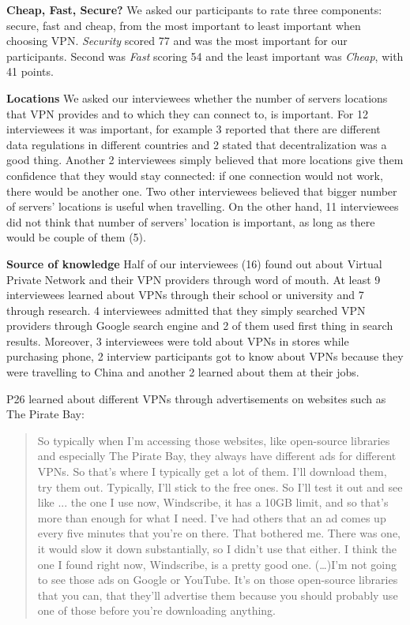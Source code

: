 \textbf{Cheap, Fast, Secure?} We asked our participants to rate three
components: secure, fast and cheap, from the most important to least important
when choosing VPN. \textit{Security} scored 77 and was the most important for
our participants. Second was \textit{Fast} scoring 54 and the least important
was \textit{Cheap}, with 41 points.


\textbf{Locations} We asked our interviewees whether the number of servers
locations that VPN provides and to which they can connect to, is important.
For 12 interviewees it was important, for example 3 reported that there are
different data regulations in different countries and 2 stated that
decentralization was a good thing. Another 2 interviewees simply believed that
more locations give them confidence that they would stay connected: if one
connection would not work, there would be another one. Two other interviewees
believed that bigger number of servers’ locations is useful when travelling.
On the other hand, 11 interviewees did not think that number of servers’
location is important, as long as there would be couple of them (5).  

\textbf{Source of knowledge} Half of our interviewees (16) found out about
Virtual Private Network and their VPN providers through word of mouth. At
least 9 interviewees learned about VPNs through their school or university and
7 through research. 4 interviewees admitted that they simply searched VPN
providers through Google search engine and 2 of them used first thing in
search results. Moreover, 3 interviewees were told about VPNs in stores while
purchasing phone, 2 interview participants got to know about VPNs because they
were travelling to China and another 2 learned about them at their jobs.


P26 learned about different VPNs through advertisements on websites such as
The Pirate Bay: \begin{quote}So typically when I'm accessing those websites,
    like open-source libraries and especially The Pirate Bay, they always have
    different ads for different VPNs. So that's where I typically get a lot of
    them. I'll download them, try them out. Typically, I'll stick to the free
    ones. So I'll test it out and see like ... the one I use now, Windscribe,
    it has a 10GB limit, and so that's more than enough for what I need. I've
    had others that an ad comes up every five minutes that you're on there.
    That bothered me. There was one, it would slow it down substantially, so I
    didn't use that either. I think the one I found right now, Windscribe, is
    a pretty good one.  (\dots)I'm not going to see those ads on Google or
YouTube. It's on those open-source libraries that you can, that they'll
advertise them because you should probably use one of those before you're
downloading anything.\end{quote}

